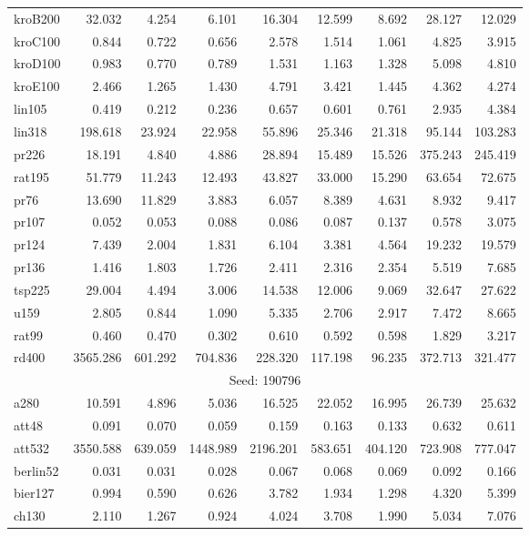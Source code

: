 \begin{center}
\begin{longtable}{lrrrrrrrr}
kroB200  & 32.032 & 4.254 & 6.101 & 16.304 & 12.599 & 8.692 & 28.127 & 12.029\\
kroC100  & 0.844 & 0.722 & 0.656 & 2.578 & 1.514 & 1.061 & 4.825 & 3.915\\
kroD100  & 0.983 & 0.770 & 0.789 & 1.531 & 1.163 & 1.328 & 5.098 & 4.810\\
kroE100  & 2.466 & 1.265 & 1.430 & 4.791 & 3.421 & 1.445 & 4.362 & 4.274\\
lin105  & 0.419 & 0.212 & 0.236 & 0.657 & 0.601 & 0.761 & 2.935 & 4.384\\
lin318  & 198.618 & 23.924 & 22.958 & 55.896 & 25.346 & 21.318 & 95.144 & 103.283\\
pr226  & 18.191 & 4.840 & 4.886 & 28.894 & 15.489 & 15.526 & 375.243 & 245.419\\
rat195  & 51.779 & 11.243 & 12.493 & 43.827 & 33.000 & 15.290 & 63.654 & 72.675\\
pr76  & 13.690 & 11.829 & 3.883 & 6.057 & 8.389 & 4.631 & 8.932 & 9.417\\
pr107  & 0.052 & 0.053 & 0.088 & 0.086 & 0.087 & 0.137 & 0.578 & 3.075\\
pr124  & 7.439 & 2.004 & 1.831 & 6.104 & 3.381 & 4.564 & 19.232 & 19.579\\
pr136  & 1.416 & 1.803 & 1.726 & 2.411 & 2.316 & 2.354 & 5.519 & 7.685\\
tsp225  & 29.004 & 4.494 & 3.006 & 14.538 & 12.006 & 9.069 & 32.647 & 27.622\\
u159  & 2.805 & 0.844 & 1.090 & 5.335 & 2.706 & 2.917 & 7.472 & 8.665\\
rat99  & 0.460 & 0.470 & 0.302 & 0.610 & 0.592 & 0.598 & 1.829 & 3.217\\
rd400  & 3565.286 & 601.292 & 704.836 & 228.320 & 117.198 & 96.235 & 372.713 & 321.477\\
\hline \multicolumn{9}{c}{{Seed: 190796}} \\ \hline
a280 & 10.591 & 4.896 & 5.036 & 16.525 & 22.052 & 16.995 & 26.739 & 25.632\\
att48  & 0.091 & 0.070 & 0.059 & 0.159 & 0.163 & 0.133 & 0.632 & 0.611\\
att532  & 3550.588 & 639.059 & 1448.989 & 2196.201 & 583.651 & 404.120 & 723.908 & 777.047\\
berlin52  & 0.031 & 0.031 & 0.028 & 0.067 & 0.068 & 0.069 & 0.092 & 0.166\\
bier127  & 0.994 & 0.590 & 0.626 & 3.782 & 1.934 & 1.298 & 4.320 & 5.399\\
ch130  & 2.110 & 1.267 & 0.924 & 4.024 & 3.708 & 1.990 & 5.034 & 7.076\\

\end{longtable}
\end{center}
